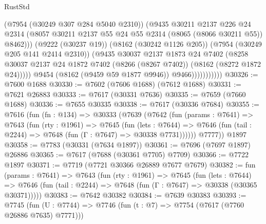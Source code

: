 \begin{lexlean}{RustStd}
\begin{coremodule}
                              (@7954 (@30249 @307 @284 @5040 @2310))
                              (@9435
                                @30211
                                @2137
                                @226
                                @24
                                @2314
                                (@8057
                                  @30211
                                  @2137
                                  @55
                                  @24
                                  @55
                                  @2314
                                  (@8065 (@8066 @30211 @55))
                                  @8462)))
                            (@9222 (@30237 @19))
                            (@8162 (@30242 @1126 @205))
                            (@7954 (@30249 @205 @141 @2414 @2310))
                            (@9435
                              @30037
                              @2137
                              @1873
                              @24
                              @7402
                              (@8258
                                @30037
                                @2137
                                @24
                                @1872
                                @7402
                                (@8266 (@8267 @7402))
                                (@8162 (@8272 @1872 @24)))))
                          @9454
                          (@8162 (@9459 @59 @1877 @9946))
                          @9466)))))))))))
@30326 := @7600 @1688
@30330 := @7602 (@7606 @1688) (@7612 @1688)
@30331 := @7621 @26883
@30333 := @7617 (@30331 @7636)
@30335 := @7659 (@7660 @1688)
@30336 := @7655 @30335
@30338 := @7617 (@30336 @7684)
@30355 := @7616
    (fun (fn : @134) =>
    @30333
      (@7639
        (@7642
          (fun (params : @7641) =>
          @7643
            (fun (rty : @1961) =>
            @7645
              (fun (lets : @7644) =>
              @7646 (fun (tail : @2244) => @7648 (fun (Γ : @7647) => @30338 @7731))))))
        @7777))
    @1897
@30358 := @7783 (@30331 (@7634 @1897))
@30361 := @7696 (@7697 @1897) @26886
@30365 := @7617 (@7688 (@30361 @7705) @7709)
@30366 := @7722 @1897
@30371 := @7719 (@7721 @30366 @26889 @7677 @7679)
@30382 := fun (params : @7641) =>
  @7643
    (fun (rty : @1961) =>
    @7645
      (fun (lets : @7644) =>
      @7646 (fun (tail : @2244) => @7648 (fun (Γ : @7647) => @30338 (@30365 @30371)))))
@30383 := @7642 @30382
@30384 := @7639 @30383
@30393 := @7745
    (fun (U : @7744) => @7746 (fun (t : @7) => @7754 (@7617 (@7760 @26886 @7635) @7771)))

\end{coremodule}
\end{lexlean}
